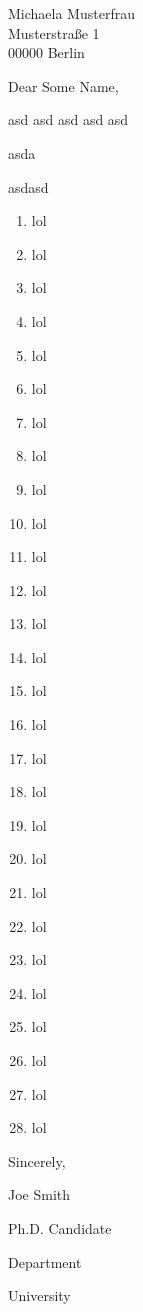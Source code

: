 \documentclass{defaultLetter}
\date{Mo 27.01.2015}
\begin{document}
\begin{letter}{Michaela Musterfrau \\ Musterstraße 1 \\ 00000 Berlin}%

\opening{Dear Some Name,}
asd asd asd asd asd \par\addvspace{\medskipamount}\noindent asda \par\addvspace{\medskipamount}\noindent asdasd



\lipsum


\begin{enumerate}
\item lol
\item lol
\item lol
\item lol
\item lol
\item lol
\item lol
\item lol
\item lol
\item lol
\item lol
\item lol
\item lol
\item lol
\item lol
\item lol
\item lol
\item lol
\item lol
\item lol
\item lol
\item lol
\item lol
\item lol
\item lol
\item lol
\item lol
\item lol



\end{enumerate}


\vfill

Sincerely,

\vfill

Joe Smith

Ph.D. Candidate

Department 

University 
\end{letter}
\end{document}

